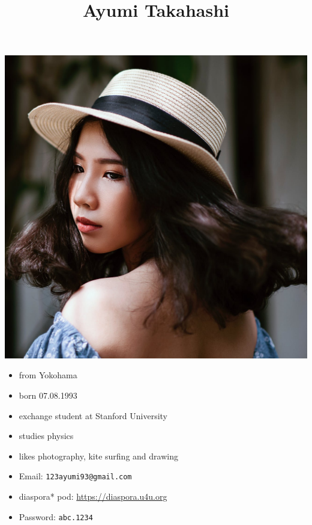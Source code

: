 \documentclass[11pt]{article}
\date{}
\title{Ayumi Takahashi}
\begin{document}
\maketitle
\includegraphics[width=.9\linewidth]{AyumiTakahashi.jpg}

\begin{itemize}
\item from Yokohama
\item born 07.08.1993
\item exchange student at Stanford University
\item studies physics
\item likes photography, kite surfing and drawing
\item Email: \texttt{123ayumi93@gmail.com}
\item diaspora* pod: \url{https://diaspora.u4u.org}
\item Password: \texttt{abc.1234}
\end{itemize}
\end{document}
